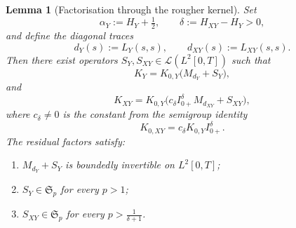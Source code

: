 \documentclass[11pt,a4paper]{amsart}
\theoremstyle{plain}
\newtheorem{lemma}[theorem]{Lemma}
\theoremstyle{definition}
\theoremstyle{remark}
\begin{document}
\begin{lemma}[Factorisation through the rougher kernel]\label{lem:roughfactor}
Set
\[
\alpha_Y:=H_Y+\tfrac12,
\qquad
\delta:=H_{XY}-H_Y>0,
\]
and define the diagonal traces
\[
d_Y(s):=L_Y(s,s),
\qquad
d_{XY}(s):=L_{XY}(s,s).
\]
Then there exist operators $S_Y,S_{XY}\in\mathcal L(L^2[0,T])$ such that
\begin{equation}\label{eq:KYfactor}
K_Y=K_{0,Y}\bigl(M_{d_Y}+S_Y\bigr),
\end{equation}
and
\begin{equation}\label{eq:KXYfactor}
K_{XY}=K_{0,Y}\bigl(c_\delta I_{0+}^{\delta}M_{d_{XY}}+S_{XY}\bigr),
\end{equation}
where $c_\delta\neq 0$ is the constant from the semigroup identity
\[
K_{0,XY}=c_\delta K_{0,Y}I_{0+}^{\delta}.
\]
The residual factors satisfy:
\begin{enumerate}[label=(\roman*)]
\item $M_{d_Y}+S_Y$ is boundedly invertible on $L^2[0,T]$;
\item $S_Y\in \mathfrak S_p$ for every $p>1$;
\item $S_{XY}\in \mathfrak S_p$ for every $p>\frac{1}{\delta+1}$.
\end{enumerate}
\end{lemma}
\end{document}
